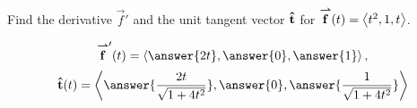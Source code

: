 \documentclass{ximera}
\author{David Guichard \and Neal Koblitz \and H. Jerome Keisler \and Albert Scheller \and Barry Balof \and Mike Wills \and Matthew Carr}
\begin{document}
\begin{exercise}
Find the derivative $\vec{f}'$ and the unit tangent vector $\mathbf{\hat{t}}$ for
${\overset{\boldsymbol{\rightharpoonup}}{\mathbf{f}}}(t)=\left\langle t^2,1,t\right\rangle$.

\begin{prompt}
\[
\vec{f}'(t)=\vector{\answer{2t},\answer{0},\answer{1}},
\]
\[
\utan(t)=\vector{\answer{\frac{2t}{\sqrt{1+4t^2}}},\answer{0},\answer{\frac{1}{\sqrt{1+4t^2}}}}
\]
\end{prompt}


\end{exercise}
\end{document}
